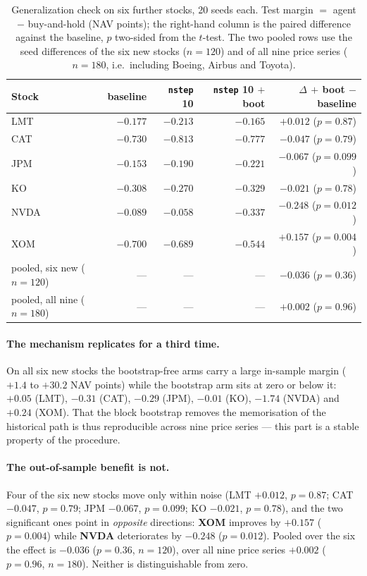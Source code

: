 \begin{table}[H]
  \centering
  \caption{Generalization check on six further stocks, 20 seeds each. Test margin $=$ agent
           $-$ buy-and-hold (NAV points); the right-hand column is the paired difference
           against the baseline, $p$ two-sided from the $t$-test. The two pooled rows use
           the seed differences of the six new stocks ($n=120$) and of all nine price
           series ($n=180$, i.e.\ including Boeing, Airbus and Toyota).}
  \label{tab:update-a3c-generalization}
  \small
  \begin{tabular}{lrrrr}
    \toprule
    Stock & baseline & \texttt{nstep} 10 & \texttt{nstep} 10 $+$ boot & $\Delta$ $+$ boot $-$ baseline\\
    \midrule
    LMT  & $-0.177$ & $-0.213$ & $-0.165$ & $+0.012$ ($p=0.87$)\\
    CAT  & $-0.730$ & $-0.813$ & $-0.777$ & $-0.047$ ($p=0.79$)\\
    JPM  & $-0.153$ & $-0.190$ & $-0.221$ & $-0.067$ ($p=0.099$)\\
    KO   & $-0.308$ & $-0.270$ & $-0.329$ & $-0.021$ ($p=0.78$)\\
    NVDA & $-0.089$ & $-0.058$ & $-0.337$ & $-0.248$ ($p=0.012$)\\
    XOM  & $-0.700$ & $-0.689$ & $-0.544$ & $+0.157$ ($p=0.004$)\\
    \midrule
    pooled, six new ($n=120$)   & --- & --- & --- & $-0.036$ ($p=0.36$)\\
    pooled, all nine ($n=180$)  & --- & --- & --- & $+0.002$ ($p=0.96$)\\
    \bottomrule
  \end{tabular}
\end{table}

\paragraph{The mechanism replicates for a third time.} On all six new stocks the
bootstrap-free arms carry a large in-sample margin ($+1.4$ to $+30.2$ NAV points) while the
bootstrap arm sits at zero or below it: $+0.05$ (LMT), $-0.31$ (CAT), $-0.29$ (JPM),
$-0.01$ (KO), $-1.74$ (NVDA) and $+0.24$ (XOM). That the block bootstrap removes the
memorisation of the historical path is thus reproducible across nine price series --- this
part is a stable property of the procedure.

\paragraph{The out-of-sample benefit is not.} Four of the six new stocks move only within
noise (LMT $+0.012$, $p=0.87$; CAT $-0.047$, $p=0.79$; JPM $-0.067$, $p=0.099$; KO
$-0.021$, $p=0.78$), and the two significant ones point in \emph{opposite} directions:
\textbf{XOM} improves by $+0.157$ ($p=0.004$) while \textbf{NVDA} deteriorates by $-0.248$
($p=0.012$). Pooled over the six the effect is $-0.036$ ($p=0.36$, $n=120$), over all nine
price series $+0.002$ ($p=0.96$, $n=180$). Neither is distinguishable from zero.

